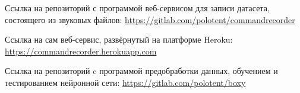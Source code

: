 Ссылка на репозиторий с программой веб-сервисом для записи датасета, состоящего из звуковых файлов: \url{https://gitlab.com/polotent/commandrecorder}

Ссылка на сам веб-сервис, развёрнутый на платформе Heroku: \url{https://commandrecorder.herokuapp.com}


Ссылка на репозиторий c программой предобработки данных, обучением и тестированием нейронной сети: \url{https://gitlab.com/polotent/boxy}